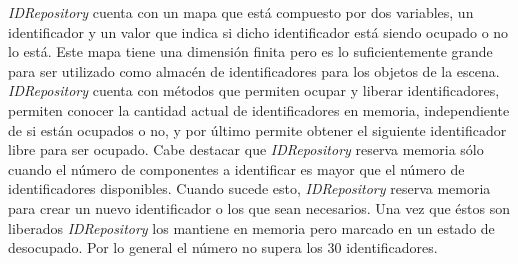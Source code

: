 \documentclass[a4paper,12pt,openany,oneside]{book}
\begin{document}
\textit{IDRepository} cuenta con un mapa que está compuesto por dos variables, un identificador y un valor que indica si dicho identificador está siendo ocupado o no lo está. Este mapa tiene una dimensión finita pero es lo suficientemente grande para ser utilizado como almacén de identificadores para los objetos de la escena.
\newpage
\textit{IDRepository} cuenta con métodos que permiten ocupar y liberar identificadores, permiten conocer la cantidad actual de identificadores en memoria, independiente de si están ocupados o no, y por último permite obtener el siguiente identificador libre para ser ocupado. Cabe destacar que \textit{IDRepository} reserva memoria sólo cuando el número de componentes a identificar es mayor que el número de identificadores disponibles. Cuando sucede esto, \textit{IDRepository} reserva memoria para crear un nuevo identificador o los que sean necesarios. Una vez que éstos son liberados \textit{IDRepository} los mantiene en memoria pero marcado en un estado de desocupado. Por lo general el número no supera los 30 identificadores.
\end{document}
